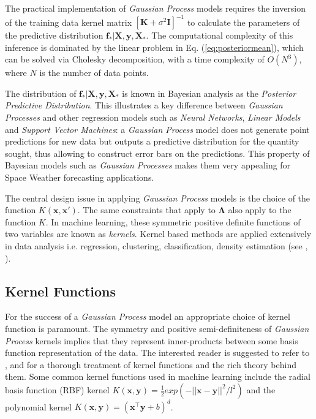 \documentclass[draft,sw]{AGUTeX}
\begin{document}
\begin{article}
The practical implementation of \emph{Gaussian Process} models requires the inversion of the training data kernel matrix $[\mathbf{K} + \sigma^{2} \mathbf{I}]^{-1}$ to calculate the parameters of the predictive distribution $\mathbf{f_*}|\mathbf{X},\mathbf{y},\mathbf{X_*}$. The computational complexity of this inference is dominated by the linear problem in Eq. (\ref{eq:posteriormean}), which can be solved via Cholesky decomposition, with a time complexity of $O(N^3)$, where $N$ is the number of data points.

The distribution of $\mathbf{f_*}| \mathbf{X},\mathbf{y},\mathbf{X_*}$ is known in Bayesian analysis as the \emph{Posterior Predictive Distribution}. This illustrates a key difference between \emph{Gaussian Processes} and other regression models such as \emph{Neural Networks}, \emph{Linear Models} and \emph{Support Vector Machines}: a \emph{Gaussian Process} model does not generate point predictions for new data but outputs a predictive distribution for the quantity sought, thus allowing to construct error bars on the predictions. This property of Bayesian models such as \emph{Gaussian Processes} makes them very appealing for Space Weather forecasting applications. 

The central design issue in applying \emph{Gaussian Process} models is the choice of the function $K(\mathbf{x}, \mathbf{x}')$. The same constraints that apply to $\mathbf{\Lambda}$ also apply to the function $K$. In machine learning, these symmetric positive definite functions of two variables are known as \emph{kernels}. Kernel based methods are applied extensively in data analysis i.e. regression, clustering, classification, density estimation (see \citet{Scholkopf:2001:LKS:559923}, \citet{hofmann2008}).

\subsection{Kernel Functions}

For the success of a \emph{Gaussian Process} model an appropriate choice of kernel function is paramount. The symmetry and positive semi-definiteness of \emph{Gaussian Process} kernels implies that they represent inner-products between some basis function representation of the data. The interested reader is suggested to refer to \citet{Berlinet2004}, \citet{Scholkopf:2001:LKS:559923} and \citet{hofmann2008} for a thorough treatment of kernel functions and the rich theory behind them. Some common kernel functions used in machine learning include the radial basis function (RBF) kernel $K(\mathbf{x}, \mathbf{y}) = \frac{1}{2} exp(-||\mathbf{x} - \mathbf{y}||^2/l^2)$ and the polynomial kernel $K(\mathbf{x}, \mathbf{y}) = (\mathbf{x}^\intercal \mathbf{y} + b)^d$. 


\end{article}
\end{document}
